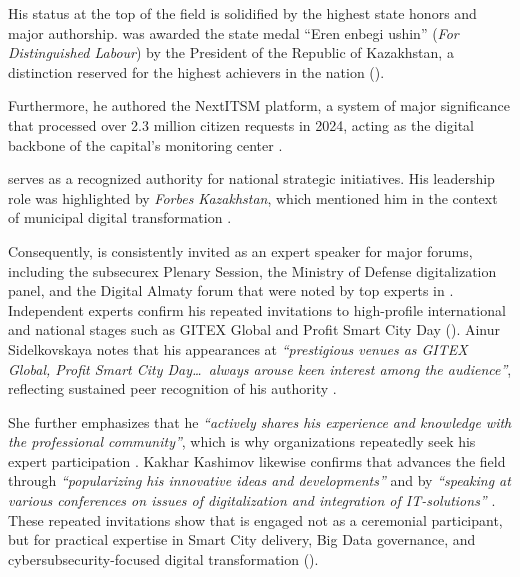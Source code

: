 His status at the top of the field is solidified by the highest state honors and major authorship. \mrl{} was awarded the state medal ``Eren enbegi ushin'' (\emph{For Distinguished Labour}) by the President of the Republic of Kazakhstan, a distinction reserved for the highest achievers in the nation ().

Furthermore, he authored the NextITSM platform, a system of major significance that processed over 2.3 million citizen requests in 2024, acting as the digital backbone of the capital’s monitoring center .

\mrl{} serves as a recognized authority for national strategic initiatives. His leadership role was highlighted by \emph{Forbes Kazakhstan}, which mentioned him in the context of municipal digital transformation .

Consequently, \mrl{} is consistently invited as an expert speaker for major forums, including the subsecurex Plenary Session, the Ministry of Defense digitalization panel, and the Digital Almaty forum that were noted by top experts in . Independent experts confirm his repeated invitations to high-profile international and national stages such as GITEX Global and Profit Smart City Day (). Ainur Sidelkovskaya notes that his appearances at \emph{``prestigious venues as GITEX Global, Profit Smart City Day\dots\ always arouse keen interest among the audience''}, reflecting sustained peer recognition of his authority .

She further emphasizes that he \emph{``actively shares his experience and knowledge with the professional community''}, which is why organizations repeatedly seek his expert participation . Kakhar Kashimov likewise confirms that \mrl{} advances the field through \emph{``popularizing his innovative ideas and developments''} and by \emph{``speaking at various conferences on issues of digitalization and integration of IT-solutions''} . These repeated invitations show that \mrl{} is engaged not as a ceremonial participant, but for practical expertise in Smart City delivery, Big Data governance, and cybersubsecurity-focused digital transformation ().

